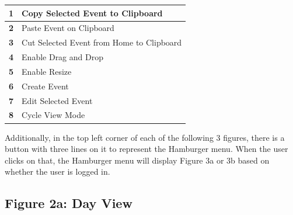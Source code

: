 \documentclass{scrreprt}
\begin{document}
\begin{center}
\begin{longtable}{ | p{0.3cm} | p{7.5cm} | }
\hline
\textbf{1} & Copy Selected Event to Clipboard \\
\hline
\textbf{2} & Paste Event on Clipboard \\
\hline
\textbf{3} & Cut Selected Event from Home to Clipboard \\
\hline
\textbf{4} & Enable Drag and Drop \\
\hline
\textbf{5} & Enable Resize \\
\hline
\textbf{6} & Create Event \\
\hline
\textbf{7} & Edit Selected Event \\
\hline
\textbf{8} & Cycle View Mode \\
\hline
\end{longtable}
\end{center}

Additionally, in the top left corner of each of the following 3 figures, there is a button with three lines on it to represent the Hamburger menu.  When the user clicks on that, the Hamburger menu will display Figure 3a or 3b based on whether the user is logged in.

\subsection{Figure 2a: Day View}
\end{document}
